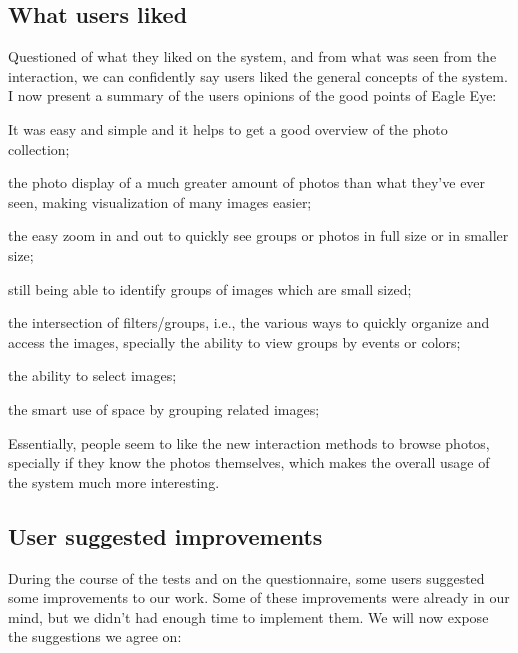 \subsection{What users liked}

Questioned of what they liked on the system, and from what was seen from the interaction, we can confidently say users liked the general concepts of the system. I now present a summary of the users opinions of the good points of Eagle Eye:

\pagebreak

\begin{myitemize}
\item It was easy and simple and it helps to get a good overview of the photo collection;
\item the photo display of a much greater amount of photos than what they've ever seen, making visualization of many images easier;
\item the easy zoom in and out to quickly see groups or photos in full size or in smaller size;
\item still being able to identify groups of images which are small sized;
\item the intersection of filters/groups, i.e., the various ways to quickly organize and access the images, specially the ability to view groups by events or colors;
\item the ability to select images;
\item the smart use of space by grouping related images;
\end{myitemize}

Essentially, people seem to like the new interaction methods to browse photos, specially if they know the photos themselves, which makes the overall usage of the system much more interesting.




\subsection{User suggested improvements}

During the course of the tests and on the questionnaire, some users suggested some improvements to our work. Some of these improvements were already in our mind, but we didn't had enough time to implement them. We will now expose the suggestions we agree on:

